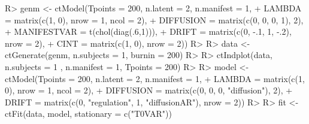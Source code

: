 \documentclass[nojss]{jss}\usepackage[]{graphicx}\usepackage[]{color}
\begin{document}

\begin{Schunk}
\begin{Sinput}
R> genm <- ctModel(Tpoints = 200, n.latent = 2, n.manifest = 1, 
+   LAMBDA = matrix(c(1, 0), nrow = 1, ncol = 2),
+   DIFFUSION = matrix(c(0, 0, 0, 1), 2),
+   MANIFESTVAR = t(chol(diag(.6,1))),
+   DRIFT = matrix(c(0, -.1, 1, -.2), nrow = 2),   
+   CINT = matrix(c(1, 0), nrow = 2))
R> 
R> data <- ctGenerate(genm, n.subjects = 1, burnin = 200)
R> 
R> ctIndplot(data, n.subjects = 1 , n.manifest = 1, Tpoints = 200)
R> 
R> model <- ctModel(Tpoints = 200, n.latent = 2, n.manifest = 1, 
+   LAMBDA = matrix(c(1, 0), nrow = 1, ncol = 2),
+   DIFFUSION = matrix(c(0, 0, 0, "diffusion"), 2),
+   DRIFT = matrix(c(0, "regulation", 1, "diffusionAR"), nrow = 2))
R> 
R> fit <- ctFit(data, model, stationary = c("T0VAR"))
\end{Sinput}
\end{Schunk}
\end{document}
